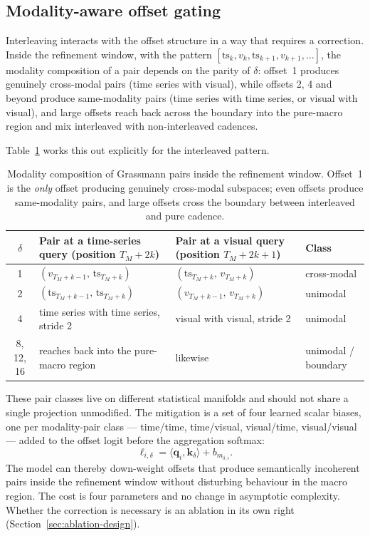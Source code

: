 \subsection{Modality-aware offset gating}

Interleaving interacts with the offset structure in a way that requires a correction. Inside
the refinement window, with the pattern
$[\mathrm{ts}_k, v_k, \mathrm{ts}_{k+1}, v_{k+1}, \ldots]$, the modality composition of a
pair depends on the parity of $\delta$: offset~1 produces genuinely cross-modal pairs
(time series with visual), while offsets 2, 4 and beyond produce same-modality pairs
(time series with time series, or visual with visual), and large offsets reach back across
the boundary into the pure-macro region and mix interleaved with non-interleaved cadences.

Table~\ref{tab:offset-parity} works this out explicitly for the interleaved pattern.

\begin{table}[h!]
\centering
\small
\begin{tabular}{c p{4.6cm} p{4.2cm} l}
\hline
$\delta$ & Pair at a time-series query (position $T_M{+}2k$) & Pair at a visual query
(position $T_M{+}2k{+}1$) & Class \\
\hline
1 & $(v_{T_M+k-1},\, \mathrm{ts}_{T_M+k})$ & $(\mathrm{ts}_{T_M+k},\, v_{T_M+k})$ &
cross-modal \\
2 & $(\mathrm{ts}_{T_M+k-1},\, \mathrm{ts}_{T_M+k})$ & $(v_{T_M+k-1},\, v_{T_M+k})$ &
unimodal \\
4 & time series with time series, stride 2 & visual with visual, stride 2 & unimodal \\
8, 12, 16 & reaches back into the pure-macro region & likewise & unimodal / boundary \\
\hline
\end{tabular}
\caption{Modality composition of Grassmann pairs inside the refinement window. Offset~1 is
the \emph{only} offset producing genuinely cross-modal subspaces; even offsets produce
same-modality pairs, and large offsets cross the boundary between interleaved and pure
cadence.}
\label{tab:offset-parity}
\end{table}

These pair classes live on different statistical manifolds and should not share a single
projection unmodified. The mitigation is a set of four learned scalar biases, one per
modality-pair class --- time/time, time/visual, visual/time, visual/visual --- added to the
offset logit before the aggregation softmax:
\[
  \ell_{i,\delta} = \langle \mathbf{q}_i, \mathbf{k}_\delta \rangle + b_{m_{\delta,i}} .
\]
The model can thereby down-weight offsets that produce semantically incoherent pairs inside
the refinement window without disturbing behaviour in the macro region. The cost is four
parameters and no change in asymptotic complexity. Whether the correction is necessary is an
ablation in its own right (Section~\ref{sec:ablation-design}).

